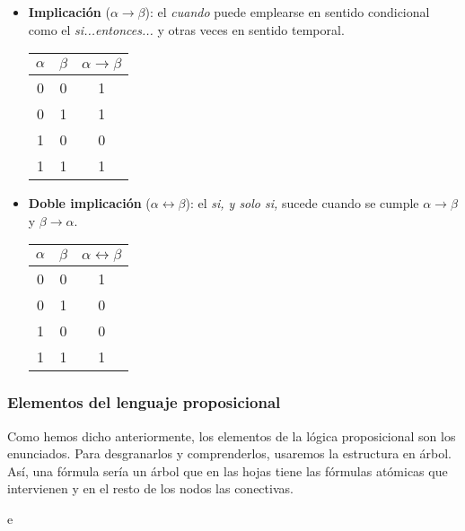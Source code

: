 \begin{itemize}
    \item \textbf{Implicación} ($\alpha \rightarrow \beta$): el \textit{cuando} puede emplearse en sentido condicional como el \textit{si...entonces...} y otras veces en sentido temporal.
          \begin{center}
              \begin{tabular}{ |c|c|c|  }
                  \hline
                  $\alpha$ & $\beta$ & $\alpha \rightarrow \beta$ \\
                  \hline
                  0        & 0       & 1                          \\
                  0        & 1       & 1                          \\
                  1        & 0       & 0                          \\
                  1        & 1       & 1                          \\
                  \hline
              \end{tabular}
          \end{center}

    \item \textbf{Doble implicación} ($\alpha \leftrightarrow \beta$): el \textit{si, y solo si,} sucede cuando se cumple $\alpha \rightarrow \beta$ y $\beta \rightarrow \alpha$.
          \begin{center}
              \begin{tabular}{ |c|c|c|  }
                  \hline
                  $\alpha$ & $\beta$ & $\alpha \leftrightarrow \beta$ \\
                  \hline
                  0        & 0       & 1                              \\
                  0        & 1       & 0                              \\
                  1        & 0       & 0                              \\
                  1        & 1       & 1                              \\
                  \hline
              \end{tabular}
          \end{center}
\end{itemize}

\subsubsection{Elementos del lenguaje proposicional}
Como hemos dicho anteriormente, los elementos de la lógica proposicional son los enunciados. Para desgranarlos y comprenderlos, usaremos la estructura en árbol.
Así, una fórmula sería un árbol que en las hojas tiene las fórmulas atómicas que intervienen y en el resto de los nodos las conectivas.
\begin{ejemplo}
    e
\end{ejemplo}

